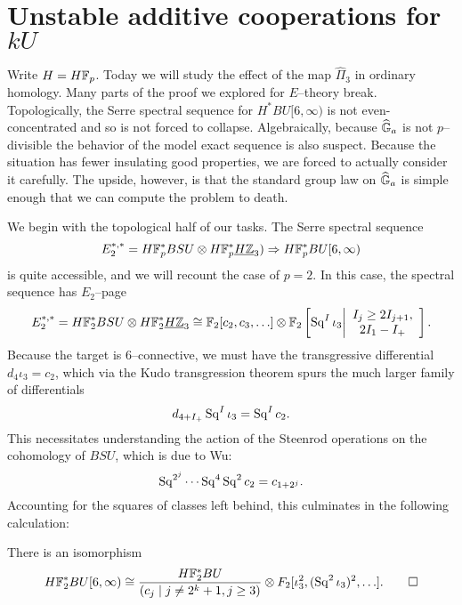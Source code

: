 \section{Unstable additive cooperations for $kU$}

Write $H = H\mathbb F_p$.  Today we will study the effect of the map $\hat \Pi_3$ in ordinary homology.  Many parts of the proof we explored for $E$--theory break.  Topologically, the Serre spectral sequence for $H^* BU[6, \infty)$ is not even-concentrated and so is not forced to collapse.  Algebraically, because $\widehat{\mathbb G}_a$ is not $p$--divisible the behavior of the model exact sequence is also suspect.  Because the situation has fewer insulating good properties, we are forced to actually consider it carefully.  The upside, however, is that the standard group law on $\widehat{\mathbb G}_a$ is simple enough that we can compute the problem to death.

We begin with the topological half of our tasks.  The Serre spectral sequence \[E_2^{*, *} = H\mathbb F_p^* BSU \otimes H\mathbb F_p^* \underline{\smash{H\mathbb Z}}_{3}) \Rightarrow H\mathbb F_p^* BU[6, \infty)\] is quite accessible, and we will recount the case of $p = 2$.  In this case, the spectral sequence has $E_2$--page \[E_2^{*, *} = H\mathbb F_2^* BSU \otimes H\mathbb F_2^* \underline{\smash{H\mathbb Z}}_{3} \cong \mathbb F_2[c_2, c_3, \ldots] \otimes \mathbb F_2\left[\operatorname{Sq}^I \iota_3 \middle| \begin{array}{c} I_j \ge 2I_{j+1}, \\ 2 I_1 - I_+ \end{array}\right].\]  Because the target is $6$--connective, we must have the transgressive differential $d_4 \iota_3 = c_2$, which via the Kudo transgression theorem spurs the much larger family of differentials \[d_{4+I_+} \operatorname{Sq}^I \iota_3 = \operatorname{Sq}^I c_2.\]  This necessitates understanding the action of the Steenrod operations on the cohomology of $BSU$, which is due to Wu: \[\operatorname{Sq}^{2^j} \cdots \operatorname{Sq}^4 \operatorname{Sq}^2 c_2 = c_{1 + 2^j}.\]  Accounting for the squares of classes left behind, this culminates in the following calculation:

\begin{theorem}\label{HF2BU6Calculation}
There is an isomorphism \[H\mathbb F_2^* BU[6, \infty) \cong \frac{H\mathbb F_2^* BU}{(c_j \mid j \ne 2^k + 1, j \ge 3)} \otimes F_2[\iota_3^2, (\operatorname{Sq}^2 \iota_3)^2, \ldots]. \qed\]
\end{theorem}

